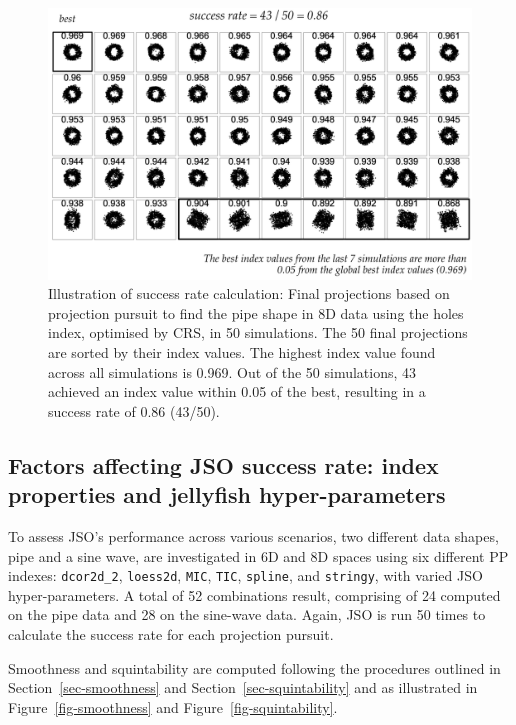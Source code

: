 \documentclass[
  12pt,
]{interact}
\theoremstyle{plain}
\begin{document}
\begin{figure}

{\centering \includegraphics[width=4.52in,height=\textheight]{figures/success-rate.png}

}

\caption{\label{fig-success-rate}Illustration of success rate
calculation: Final projections based on projection pursuit to find the
pipe shape in 8D data using the holes index, optimised by CRS, in 50
simulations. The 50 final projections are sorted by their index values.
The highest index value found across all simulations is 0.969. Out of
the 50 simulations, 43 achieved an index value within 0.05 of the best,
resulting in a success rate of 0.86 (43/50).}

\end{figure}

\hypertarget{sec-app-2}{%
\subsection{Factors affecting JSO success rate: index properties and
jellyfish hyper-parameters}\label{sec-app-2}}

To assess JSO's performance across various scenarios, two different data
shapes, pipe and a sine wave, are investigated in 6D and 8D spaces using
six different PP indexes: \texttt{dcor2d\_2}, \texttt{loess2d},
\texttt{MIC}, \texttt{TIC}, \texttt{spline}, and \texttt{stringy}, with
varied JSO hyper-parameters. A total of 52 combinations result,
comprising of 24 computed on the pipe data and 28 on the sine-wave data.
Again, JSO is run 50 times to calculate the success rate for each
projection pursuit.

Smoothness and squintability are computed following the procedures
outlined in Section~\ref{sec-smoothness} and
Section~\ref{sec-squintability} and as illustrated in
Figure~\ref{fig-smoothness} and Figure~\ref{fig-squintability}.
\end{document}
